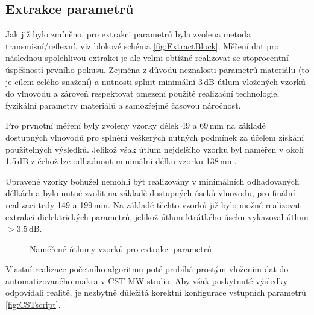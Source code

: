 \subsection{Extrakce parametrů}
Jak již bylo zmíněno, pro extrakci parametrů byla zvolena metoda transmisní/reflexní, viz blokové schéma \ref{fig:ExtractBlock}. Měření dat pro následnou spolehlivou extrakci je ale velmi obtížné realizovat se stoprocentní úspěšností prvního pokusu. Zejména z důvodu neznalosti parametrů materiálu (to je cílem celého snažení) a nutnosti splnit minimální 3\,dB útlum vložených vzorků do vlnovodu a zároveň respektovat omezení použité realizační technologie, fyzikální parametry materiálů a samozřejmě časovou náročnost.

Pro prvnotní měření byly zvoleny vzorky délek 49 a 69\,mm na základě dostupných vlnovodů pro splnění veškerých nutných podmínek za účelem získání použitelných výsledků. Jelikož však útlum nejdelšího vzorku byl naměřen v okolí 1.5\,dB z čehož lze odhadnout minimální délku vzorku 138\,mm. 

Upravené vzorky bohužel nemohli být realizovány v minimálních odhadovaných délkách a bylo nutné zvolit na základě dostupných úseků vlnovodu, pro finální realizaci tedy 149 a 199\,mm. Na základě těchto vzorků již bylo možné realizovat extrakci dielektrických parametrů, jelikož útlum ktrátkého úseku vykazoval útlum $>$3.5\,dB.

\begin{figure}
\label{fig:Attmeasure}
\caption{Naměřené útlumy vzorků pro extrakci parametrů}
\end{figure}


Vlastní realizace početního algoritmu poté probíhá prostým vložením dat do automatizovaného makra v CST MW studio. Aby však poskytnuté výsledky odpovídali realitě, je nezbytně důležitá korektní konfigurace vstupních parametrů \ref{fig:CSTscript}.


